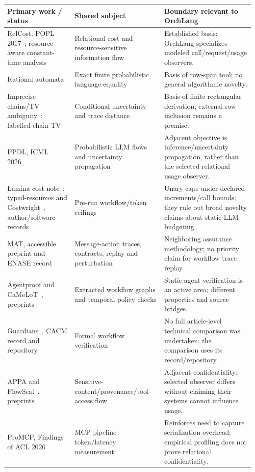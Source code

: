 \documentclass[11pt,a4paper]{article}
\begin{document}
\begin{longtable}{@{}>{\raggedright\arraybackslash}p{3.2cm}>{\raggedright\arraybackslash}p{4.7cm}>{\raggedright\arraybackslash}p{6.8cm}@{}}
\toprule
Primary work / status & Shared subject & Boundary relevant to OrchLang \\
\midrule\endhead
RelCost, POPL 2017~\cite{relcost}; resource-aware constant-time analysis~\cite{ngo} & Relational cost and resource-sensitive information flow & Established basis; OrchLang specializes modeled call/request/usage observers. \\
Rational automata~\cite{tzeng,kiefer,weighted} & Exact finite probabilistic language equality & Basis of row-span tool; no general algorithmic novelty. \\
Imprecise chains/TV ambiguity~\cite{cooman,tzortzis}; labelled-chain TV~\cite{chen} & Conditional uncertainty and trace distance & Basis of finite rectangular derivation; external row inclusion remains a premise. \\
PPDL, ICML 2026~\cite{ppdl} & Probabilistic LLM flows and uncertainty propagation & Adjacent objective is inference/uncertainty propagation, rather than the selected relational usage observer. \\
Lamina cost note~\cite{lamina}; typed-resources and Costwright~\cite{typed,costwright}, author/software records & Pre-run workflow/token ceilings & Unary caps under declared increments/call bounds; they rule out broad novelty claims about static LLM budgeting. \\
MAT, accessible preprint and ENASE record~\cite{mat} & Message-action traces, contracts, replay and perturbation & Neighboring assurance methodology; no priority claim for workflow trace replay. \\
Agentproof and CaMeLoT~\cite{agentproof,camelot}, preprints & Extracted workflow graphs and temporal policy checks & Static agent verification is an active area; different properties and source bridges. \\
Guardians~\cite{guardians}, CACM record and repository & Formal workflow verification & No full article-level technical comparison was undertaken; the comparison uses its record/repository. \\
APPA and FlowSeal~\cite{appa,flowseal}, preprints & Sensitive-content/provenance/tool-access flow & Adjacent confidentiality; selected observer differs without claiming their systems cannot influence usage. \\
ProMCP, Findings of ACL 2026~\cite{promcp} & MCP pipeline token/latency measurement & Reinforces need to capture serialization overhead; empirical profiling does not prove relational confidentiality. \\
\bottomrule
\end{longtable}
\end{document}
